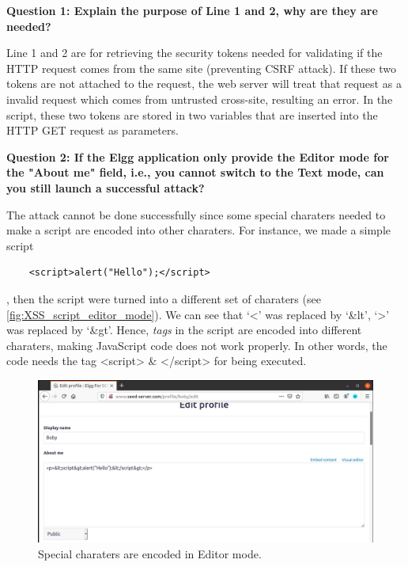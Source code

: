 \textbf{Question 1: Explain the purpose of Line 1 and 2, why are they are needed?}

Line 1 and 2 are for retrieving the security tokens needed for
validating if the HTTP request comes from the same site (preventing CSRF attack).
If these two tokens are not attached to the request, the web server will treat that
request as a invalid request which comes from untrusted cross-site, resulting an error.
In the script, these two tokens are stored in two variables that are inserted into the
HTTP GET request as parameters.

\textbf{Question 2: If the Elgg application only provide the Editor mode for the "About me"
field, i.e., you cannot switch to the Text mode, can you still launch a successful attack?}

The attack cannot be done successfully since some special charaters needed to make a script
are encoded into other charaters. For instance, we made a simple script

\begin{verbatim}
    <script>alert("Hello");</script>
\end{verbatim}

, then the script were turned into a different set of charaters
(see \autoref{fig:XSS_script_editor_mode}). We can see that `<' was replaced by `\&lt',
`>' was replaced by `\&gt'. Hence, \emph{tags} in the script are encoded into different
charaters, making JavaScript code does not work properly. In other words, the code needs
the tag <script> \& </script> for being executed. 


\begin{figure}[h]
    \centering
    \includegraphics[height=\textheight,width=\textwidth,keepaspectratio]
    {figures/script_edit_mode.png}
    \caption{Special charaters are encoded in Editor mode.}
    \label{fig:XSS_script_editor_mode}
\end{figure}